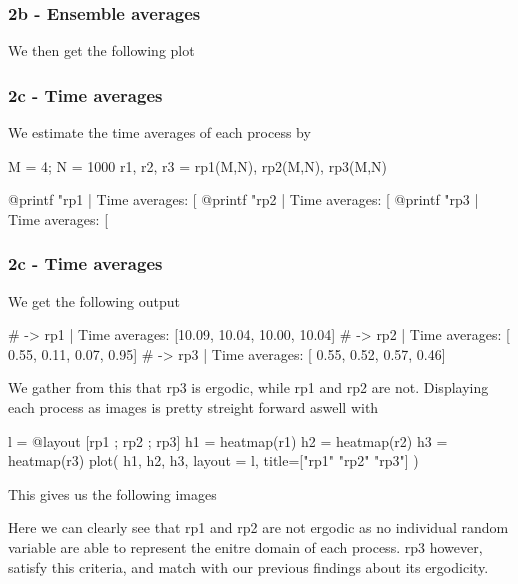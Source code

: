 \documentclass[compress]{beamer}
\begin{document}
\begin{frame}
    \frametitle{2b - Ensemble averages}
    We then get the following plot
    \begin{figure}
        
    \end{figure}
\end{frame}

\begin{frame}[fragile]
    \frametitle{2c - Time averages}
    We estimate the time averages of each process by
    \begin{jllisting}[gobble=8]
        M = 4; N = 1000
        r1, r2, r3 = rp1(M,N), rp2(M,N), rp3(M,N)

        @printf "rp1 | Time averages: [%
        @printf "rp2 | Time averages: [%
        @printf "rp3 | Time averages: [%
    \end{jllisting}
\end{frame}

\begin{frame}[fragile]
    \frametitle{2c - Time averages}
    We get the following output
    \begin{jllisting}[gobble=8]
        # -> rp1 | Time averages: [10.09, 10.04, 10.00, 10.04]
        # -> rp2 | Time averages: [ 0.55,  0.11,  0.07,  0.95]
        # -> rp3 | Time averages: [ 0.55,  0.52,  0.57,  0.46]
    \end{jllisting}
    We gather from this that rp3 is ergodic, while rp1 and rp2 are not.
    Displaying each process as images is pretty streight forward aswell with
    \begin{jllisting}[gobble=8]
        l = @layout [rp1 ; rp2 ; rp3]
        h1 = heatmap(r1)
        h2 = heatmap(r2)
        h3 = heatmap(r3)
        plot(
            h1, h2, h3, layout = l,
            title=["rp1" "rp2" "rp3"]
        )
    \end{jllisting}
\end{frame}

\begin{frame}
    This gives us the following images
    \begin{figure}
        
    \end{figure}
    Here we can clearly see that rp1 and rp2 are not ergodic as no individual
    random variable are able to represent the enitre domain of each process.
    rp3 however, satisfy this criteria, and match with our previous findings
    about its ergodicity.
\end{frame}
\end{document}

